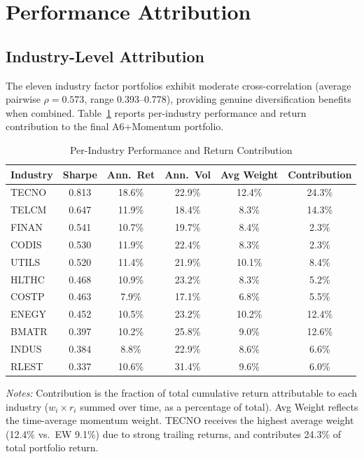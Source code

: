 \documentclass[12pt,a4paper]{article}
\begin{document}
\section{Performance Attribution}
\label{sec:attribution}

\subsection{Industry-Level Attribution}

The eleven industry factor portfolios exhibit moderate cross-correlation (average pairwise $\rho = 0.573$, range 0.393--0.778), providing genuine diversification benefits when combined. Table~\ref{tab:industry_perf} reports per-industry performance and return contribution to the final A6+Momentum portfolio.

\begin{table}[H]
\centering
\caption{Per-Industry Performance and Return Contribution}
\label{tab:industry_perf}
\small
\begin{tabular}{lccccc}
\toprule
\textbf{Industry} & \textbf{Sharpe} & \textbf{Ann.\ Ret} & \textbf{Ann.\ Vol} & \textbf{Avg Weight} & \textbf{Contribution} \\
\midrule
TECNO & 0.813 & 18.6\% & 22.9\% & 12.4\% & 24.3\% \\
TELCM & 0.647 & 11.9\% & 18.4\% & 8.3\%  & 14.3\% \\
FINAN & 0.541 & 10.7\% & 19.7\% & 8.4\%  & 2.3\% \\
CODIS & 0.530 & 11.9\% & 22.4\% & 8.3\%  & 2.3\% \\
UTILS & 0.520 & 11.4\% & 21.9\% & 10.1\% & 8.4\% \\
HLTHC & 0.468 & 10.9\% & 23.2\% & 8.3\%  & 5.2\% \\
COSTP & 0.463 &  7.9\% & 17.1\% & 6.8\%  & 5.5\% \\
ENEGY & 0.452 & 10.5\% & 23.2\% & 10.2\% & 12.4\% \\
BMATR & 0.397 & 10.2\% & 25.8\% & 9.0\%  & 12.6\% \\
INDUS & 0.384 &  8.8\% & 22.9\% & 8.6\%  & 6.6\% \\
RLEST & 0.337 & 10.6\% & 31.4\% & 9.6\%  & 6.0\% \\
\bottomrule
\end{tabular}
\begin{minipage}{\textwidth}
\vspace{0.3em}
\footnotesize
\textit{Notes:} Contribution is the fraction of total cumulative return attributable to each industry ($w_i \times r_i$ summed over time, as a percentage of total). Avg Weight reflects the time-average momentum weight. TECNO receives the highest average weight (12.4\% vs.\ EW 9.1\%) due to strong trailing returns, and contributes 24.3\% of total portfolio return.
\end{minipage}
\end{table}
\end{document}
